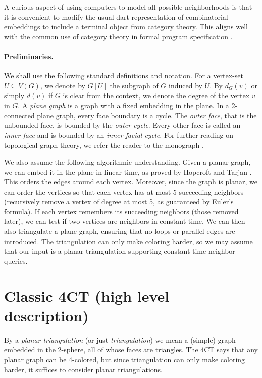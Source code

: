 \documentclass[10pt,a4paper]{article}
\begin{document}
A curious aspect 
of using computers to model all possible neighborhoods is that it is convenient to modify the usual dart representation of combinatorial embeddings \cite{MT} to include a terminal object from category theory. This aligns well with the common use of category theory in formal program specification \cite{BarrWels95}.




\paragraph{Preliminaries.}
We shall use the following standard definitions and notation. For a vertex-set $U\subseteq V(G)$, we denote by $G[U]$ the subgraph of $G$ induced by $U$. By $d_G(v)$ or simply $d(v)$ if $G$ is clear from the context, we denote the degree of the vertex $v$ in $G$. A \emph{plane graph} is a graph with a fixed embedding in the plane. 
In a 2-connected plane graph, every face boundary is a cycle. The \emph{outer face}, that is the unbounded face, is bounded by the \emph{outer cycle}. Every other face is called an \emph{inner face} and is bounded by an \emph{inner facial cycle.}
For further reading on topological graph theory, we refer the reader to the monograph \cite{MT}.

We also assume the following algorithmic understanding. Given a planar graph, we can embed it in the plane in linear time, as proved by Hopcroft and Tarjan
\cite{HopcroftT74}. This orders the edges around each vertex.
Moreover, since the graph is planar, we can order
the vertices so that each vertex has at most 5 succeeding neighbors (recursively remove a vertex of degree at most 5, as guaranteed by Euler's formula). If each vertex remembers its succeeding neighbors (those removed later), we can test if two vertices are neighbors in constant time. We can then also triangulate a plane graph, ensuring that no loops or parallel edges are introduced. The triangulation can only make coloring harder, so we may assume that our input is a planar triangulation supporting constant time neighbor queries.






\section{Classic 4CT (high level description)}\label{sect:classic4ct}

By a \emph{planar triangulation} (or just \emph{triangulation}) we mean a (simple) graph embedded in the 2-sphere, all of whose faces are triangles. The 4CT says that any planar graph can be 4-colored, but since triangulation can only make coloring harder, it suffices to consider planar triangulations. 
\end{document}
